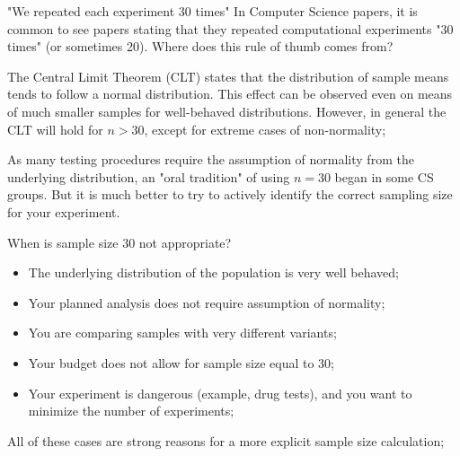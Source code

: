 
\begin{frame}{"We repeated each experiment 30 times"}
  In Computer Science papers, it is common to see papers stating that they repeated computational experiments "30 times" (or sometimes 20). Where does this rule of thumb comes from?\bigskip

  The Central Limit Theorem (CLT) states that the distribution of sample means tends to follow a normal distribution. This effect can be observed even on means of much smaller samples for well-behaved distributions. However, in general the CLT will hold for $n > 30$, except for extreme cases of non-normality;\bigskip

  As many testing procedures require the assumption of normality from the underlying distribution, an "oral tradition" of using $n=30$ began in some CS groups. But it is much better to try to actively identify the correct sampling size for your experiment.
\end{frame}

\begin{frame}{When is sample size 30 not appropriate?}
  \begin{itemize}
    \item The underlying distribution of the population is very well behaved;
    \item Your planned analysis does not require assumption of normality; \bigskip

    \item You are comparing samples with very different variants; \bigskip

    \item Your budget does not allow for sample size equal to 30;
    \item Your experiment is dangerous (example, drug tests), and you want to minimize the number of experiments;
  \end{itemize}\bigskip

  All of these cases are strong reasons for a more explicit sample size calculation;
\end{frame}


